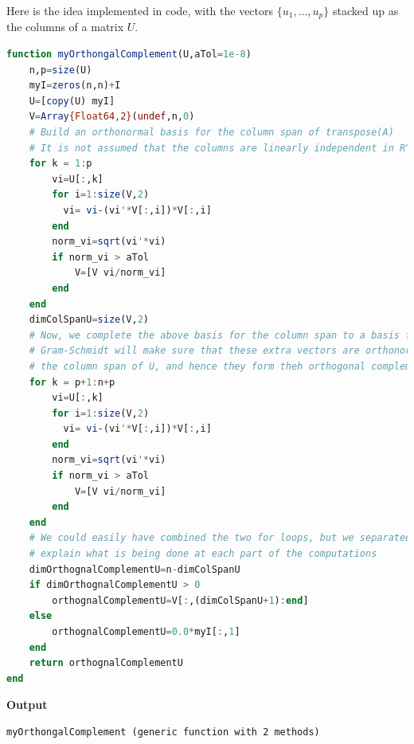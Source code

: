 Here is the idea implemented in code, with the vectors $\{u_1, \ldots,  u_p \}$ stacked up as the columns of a matrix $U$.\\

\begin{lstlisting}[language=Julia,style=mystyle]
function myOrthongalComplement(U,aTol=1e-8)
    n,p=size(U)
    myI=zeros(n,n)+I
    U=[copy(U) myI]
    V=Array{Float64,2}(undef,n,0)
    # Build an orthonormal basis for the column span of transpose(A)  
    # It is not assumed that the columns are linearly independent in R^m
    for k = 1:p
        vi=U[:,k]
        for i=1:size(V,2)
          vi= vi-(vi'*V[:,i])*V[:,i]
        end
        norm_vi=sqrt(vi'*vi)
        if norm_vi > aTol
            V=[V vi/norm_vi]
        end            
    end
    dimColSpanU=size(V,2)
    # Now, we complete the above basis for the column span to a basis for all of R^n. 
    # Gram-Schmidt will make sure that these extra vectors are orthonormal to 
    # the column span of U, and hence they form theh orthogonal complement of U
    for k = p+1:n+p
        vi=U[:,k]
        for i=1:size(V,2)
          vi= vi-(vi'*V[:,i])*V[:,i]
        end
        norm_vi=sqrt(vi'*vi)
        if norm_vi > aTol
            V=[V vi/norm_vi]
        end            
    end
    # We could easily have combined the two for loops, but we separated them so we could
    # explain what is being done at each part of the computations
    dimOrthognalComplementU=n-dimColSpanU
    if dimOrthognalComplementU > 0
        orthognalComplementU=V[:,(dimColSpanU+1):end]
    else
        orthognalComplementU=0.0*myI[:,1]
    end
    return orthognalComplementU
end
\end{lstlisting}
\textbf{Output} 
\begin{verbatim}
myOrthongalComplement (generic function with 2 methods)
\end{verbatim}


